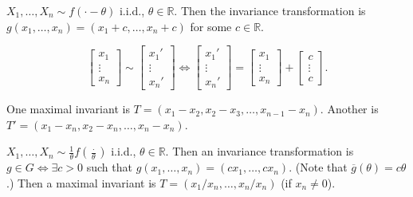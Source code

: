 \begin{example}

\(X_1, \ldots, X_n \sim f(\cdot - \theta)\) i.i.d., \(\theta \in \mathbb{R}\). Then the invariance transformation is \(g(x_1, \ldots, x_n) = (x_1 + c, \ldots, x_n +c)\) for some \(c \in \mathbb{R}\). 

\[
\begin{bmatrix}
x_1 \\
\vdots \\
x_n
\end{bmatrix} \sim \begin{bmatrix}
x_1' \\
\vdots \\
x_n'
\end{bmatrix} \iff \begin{bmatrix}
x_1' \\
\vdots \\
x_n'
\end{bmatrix} = \begin{bmatrix}
x_1 \\
\vdots \\
x_n
\end{bmatrix} + \begin{bmatrix}
c \\
\vdots \\
c
\end{bmatrix}.
\]

One maximal invariant is \(T = (x_1 - x_2, x_2 - x_3, \ldots, x_{n-1} - x_n)\). Another is \(T' = (x_1 - x_n, x_2 - x_n, \ldots, x_n - x_n)\).


\end{example}

\begin{example}

\(X_1, \ldots, X_n \sim \frac{1}{\theta} f( \frac{\cdot}{\theta} )\) i.i.d., \(\theta \in \mathbb{R}\). Then an invariance transformation is \(g \in G \iff \exists c > 0 \) such that \(g(x_1, \ldots, x_n) = (c x_1, \ldots, cx_n) \). (Note that \(\overline{g}(\theta) = c \theta\).) Then a maximal invariant is \(T = (x_1/x_n, \ldots, x_n /x_n)\) (if \(x_n \neq 0\)).

\end{example}

